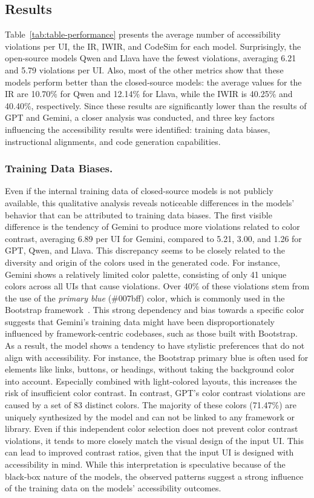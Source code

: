 \subsection{Results}
Table~\ref{tab:table-performance} presents the average 
number of accessibility violations per UI, the IR, IWIR, and 
CodeSim for each model. Surprisingly, the open-source models
Qwen and Llava have the fewest violations, averaging 
6.21 and 5.79 violations per UI. Also, most of the other metrics 
show that these models perform better than the closed-source
models: the average values for the IR are 10.70\% for Qwen and
12.14\% for Llava, while the IWIR is 40.25\%
and 40.40\%, respectively.
Since these results 
are significantly lower than the results of GPT and Gemini, 
a closer analysis was conducted, and three key factors 
influencing the accessibility results were identified: 
training data biases, instructional alignments, and 
code generation capabilities.


\subsubsection{Training Data Biases.} Even if the 
internal training data of closed-source models is not publicly 
available, this qualitative analysis reveals noticeable differences 
in the models' behavior that can be attributed to training 
data biases.\newline
The first visible difference is the tendency of Gemini to produce 
more violations related to color contrast, averaging 
6.89 per UI for Gemini, compared to 5.21, 3.00, and 1.26 for GPT,
Qwen, and Llava. This discrepancy seems to be closely related to 
the diversity and origin of the colors used in the generated code.
For instance, Gemini shows a relatively limited color palette, 
consisting of only 41 unique colors across all UIs that cause 
violations. Over 40\% of these violations stem from the use 
of the \textit{primary blue} (\#007bff) color, which is 
commonly used in the Bootstrap framework~\cite{web:bootstrapv4}.
This strong dependency and bias towards a specific color suggests 
that Gemini's training data might have been disproportionately 
influenced by framework-centric codebases, such as those built 
with Bootstrap. As a result, the model shows a tendency to have 
stylistic preferences that do not align with accessibility.
For instance, the Bootstrap primary blue is often used for 
elements like links, buttons, or headings, without taking the 
background color into account. Especially combined with 
light-colored layouts, this increases the risk of insufficient 
color contrast. In contrast, GPT's color contrast violations are 
caused by a set of 83 distinct colors. The majority of these 
colors (71.47\%) are uniquely synthesized by the model and can not 
be linked to any framework or library. Even if this 
independent color selection does not prevent color contrast 
violations, it tends to more closely match the visual 
design of the input UI. This can lead to improved contrast ratios,
given that the input UI is designed with accessibility in mind.
While this interpretation is speculative because of the 
black-box nature of the models, the observed patterns suggest 
a strong influence of the training data on the models' accessibility
outcomes.

